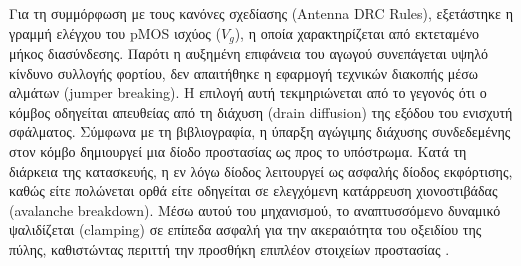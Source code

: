 Για τη συμμόρφωση με τους κανόνες σχεδίασης (Antenna DRC Rules), εξετάστηκε η γραμμή ελέγχου του pMOS ισχύος ($V_g$), η οποία χαρακτηρίζεται από εκτεταμένο μήκος διασύνδεσης. Παρότι η αυξημένη επιφάνεια του αγωγού συνεπάγεται υψηλό κίνδυνο συλλογής φορτίου, δεν απαιτήθηκε η εφαρμογή τεχνικών διακοπής μέσω αλμάτων (jumper breaking). Η επιλογή αυτή τεκμηριώνεται από το γεγονός ότι ο κόμβος οδηγείται απευθείας από τη διάχυση (drain diffusion) της εξόδου του ενισχυτή σφάλματος. Σύμφωνα με τη βιβλιογραφία, η ύπαρξη αγώγιμης διάχυσης συνδεδεμένης στον κόμβο δημιουργεί μια δίοδο προστασίας ως προς το υπόστρωμα. Κατά τη διάρκεια της κατασκευής, η εν λόγω δίοδος λειτουργεί ως ασφαλής δίοδος εκφόρτισης, καθώς είτε πολώνεται ορθά είτε οδηγείται σε ελεγχόμενη κατάρρευση χιονοστιβάδας (avalanche breakdown). Μέσω αυτού του μηχανισμού, το αναπτυσσόμενο δυναμικό ψαλιδίζεται (clamping) σε επίπεδα ασφαλή για την ακεραιότητα του οξειδίου της πύλης, καθιστώντας περιττή την προσθήκη επιπλέον στοιχείων προστασίας \cite{AlanHasting}.